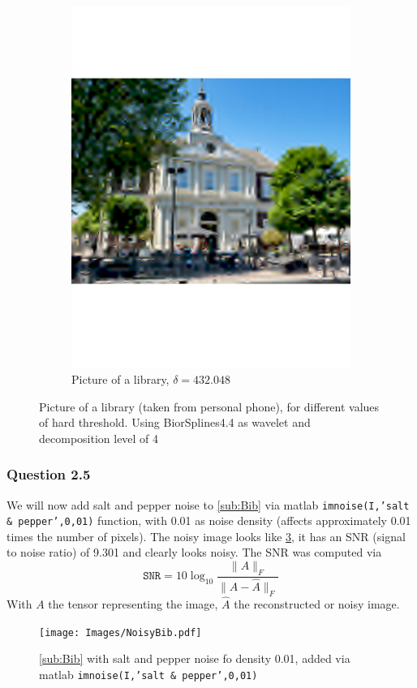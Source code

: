 \documentclass[a4paper]{article}
\begin{document}
\begin{figure}[H]
\begin{subfigure}{0.49\textwidth}
	\includegraphics[trim={4cm 8cm 4cm 8cm},clip,width=1\textwidth]{Images/BibBad.pdf}
	\caption{Picture of a library, $\delta = 432.048$}
	\label{sub:BibBad}
\end{subfigure}
	\caption{Picture of a library (taken from personal phone), for different values of hard threshold. Using BiorSplines4.4 as wavelet and decomposition level of 4}
	\label{fig:Bib}
\end{figure}

    \subsubsection{Question 2.5}

	We will now add salt and pepper noise to \cref{sub:Bib} via matlab \texttt{imnoise(I,'salt \& pepper',0,01)} function, with 0.01 as noise density (affects approximately 0.01 times the number of pixels). The noisy image looks like \cref{fig:Noisy}, it has an SNR (signal to noise ratio) of 9.301 and clearly looks noisy. The SNR was computed via
	\begin{equation} \label{eq:SNR}
		\texttt{SNR} = 10 \log_{10}{\frac{\|A\|_F}{\|A-\hat{A}\|_F}}
	\end{equation}
	With $A$ the tensor representing the image, $\hat{A}$ the reconstructed or noisy image.
    \begin{figure}[H]
	\centering
	\texttt{[image: Images/NoisyBib.pdf]}
	\caption{\cref{sub:Bib} with salt and pepper noise fo density 0.01, added via matlab \texttt{imnoise(I,'salt \& pepper',0,01)}}
	\label{fig:Noisy}
\end{figure}
\end{document}
